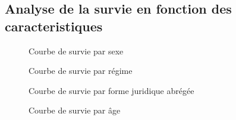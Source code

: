 \documentclass[a4paper,12pt]{report}
\begin{document}
\subsection{Analyse de la survie en fonction des caracteristiques}
\begin{figure}[H]
    \centering

    \begin{minipage}{0.48\textwidth}
        \centering
        \caption{Courbe de survie par sexe}
        \label{fig:survie_sexe}
    \end{minipage}
    \hfill
    \begin{minipage}{0.48\textwidth} %
        \centering
        \caption{Courbe de survie par régime}
        \label{fig:survie_regime_complete}
    \end{minipage}

    \vspace{1em} %

    \begin{minipage}{0.48\textwidth}
        \centering
        \caption{Courbe de survie par forme juridique abrégée}
        \label{fig:survie_forme_juridique}
    \end{minipage}
    \hfill
    \begin{minipage}{0.48\textwidth}
        \centering
        \caption{Courbe de survie par âge}
        \label{fig:survie_age}
    \end{minipage}

\end{figure} %
\end{document}
